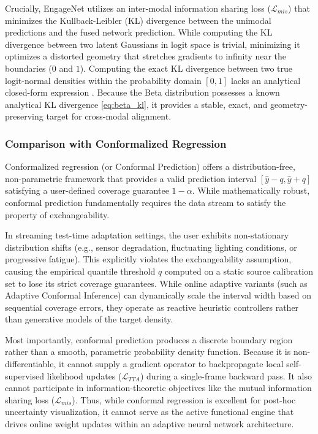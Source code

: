 \documentclass[11pt,a4paper]{article}
\begin{document}
	Crucially, EngageNet utilizes an inter-modal information sharing loss ($\mathcal{L}_{mis}$) that minimizes the Kullback-Leibler (KL) divergence between the unimodal predictions and the fused network prediction. While computing the KL divergence between two latent Gaussians in logit space is trivial, minimizing it optimizes a distorted geometry that stretches gradients to infinity near the boundaries ($0$ and $1$). Computing the exact KL divergence between two true logit-normal densities within the probability domain $[0,1]$ lacks an analytical closed-form expression \cite{aitchison1980}. Because the Beta distribution possesses a known analytical KL divergence \ref{eq:beta_kl}, it provides a stable, exact, and geometry-preserving target for cross-modal alignment.
	
	\subsubsection*{Comparison with Conformalized Regression}
	Conformalized regression (or Conformal Prediction) \cite{romano2019} offers a distribution-free, non-parametric framework that provides a valid prediction interval $[ \hat{y} - q, \hat{y} + q ]$ satisfying a user-defined coverage guarantee $1 - \alpha$. While mathematically robust, conformal prediction fundamentally requires the data stream to satisfy the property of exchangeability. 
	
	In streaming test-time adaptation settings, the user exhibits non-stationary distribution shifts (e.g., sensor degradation, fluctuating lighting conditions, or progressive fatigue). This explicitly violates the exchangeability assumption, causing the empirical quantile threshold $q$ computed on a static source calibration set to lose its strict coverage guarantees. While online adaptive variants (such as Adaptive Conformal Inference) \cite{gibbs2021} can dynamically scale the interval width based on sequential coverage errors, they operate as reactive heuristic controllers rather than generative models of the target density.
	
	Most importantly, conformal prediction produces a discrete boundary region rather than a smooth, parametric probability density function. Because it is non-differentiable, it cannot supply a gradient operator to backpropagate local self-supervised likelihood updates ($\mathcal{L}_{TTA}$) during a single-frame backward pass. It also cannot participate in information-theoretic objectives like the mutual information sharing loss ($\mathcal{L}_{mis}$). Thus, while conformal regression is excellent for post-hoc uncertainty visualization, it cannot serve as the active functional engine that drives online weight updates within an adaptive neural network architecture.
	
\end{document}
